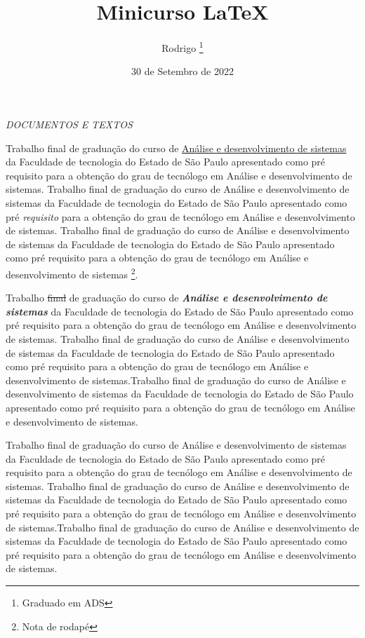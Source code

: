 \documentclass[12pt, a4paper, oneside]{book}
\begin{document}
\title{Minicurso LaTeX}
\author{Rodrigo \footnote{Graduado em ADS}}
\date{30 de Setembro de 2022}
\maketitle

\hrulefill

\begin{center}
\Large{\textit{DOCUMENTOS E TEXTOS}}
\end{center}

\hrulefill

\vspace{0.5cm}

Trabalho final de graduação do curso de \underline{Análise e desenvolvimento de sistemas} da Faculdade de tecnologia do Estado de São Paulo apresentado como pré requisito para a obtenção do grau de tecnólogo em Análise e desenvolvimento de sistemas. Trabalho final de graduação do curso de Análise e desenvolvimento de sistemas da Faculdade de tecnologia do Estado de São Paulo apresentado como pré \textit{requisito} para a obtenção do grau de tecnólogo em Análise e desenvolvimento de sistemas. Trabalho final de graduação do curso de Análise e desenvolvimento de sistemas da Faculdade de tecnologia do Estado de São Paulo apresentado como pré requisito para a obtenção do grau de tecnólogo em Análise e desenvolvimento de sistemas \footnote{Nota de rodapé}.

\begin{flushleft}
Trabalho \sout{final} de graduação do curso de \textit{\textbf{Análise e desenvolvimento de sistemas}} da Faculdade de tecnologia do Estado de São Paulo apresentado como pré requisito para a obtenção do grau de tecnólogo em Análise e desenvolvimento de sistemas. Trabalho final de graduação do curso de Análise e desenvolvimento de sistemas da Faculdade de tecnologia do Estado de São Paulo apresentado como pré requisito para a obtenção do grau de tecnólogo em Análise e desenvolvimento de sistemas.Trabalho final de graduação do curso de Análise e desenvolvimento de sistemas da Faculdade de tecnologia do Estado de São Paulo apresentado como pré requisito para a obtenção do grau de tecnólogo em Análise e desenvolvimento de sistemas.
\end{flushleft}

\begin{center}
Trabalho final de graduação do curso de Análise e desenvolvimento de sistemas da Faculdade de tecnologia do Estado de São Paulo apresentado como pré requisito para a obtenção do grau de tecnólogo em Análise e desenvolvimento de sistemas. Trabalho final de graduação do curso de Análise e desenvolvimento de sistemas da Faculdade de tecnologia do Estado de São Paulo apresentado como pré requisito para a obtenção do grau de tecnólogo em Análise e desenvolvimento de sistemas.Trabalho final de graduação do curso de Análise e desenvolvimento de sistemas da Faculdade de tecnologia do Estado de São Paulo apresentado como pré requisito para a obtenção do grau de tecnólogo em Análise e desenvolvimento de sistemas.\\
\end{center}
\end{document}
